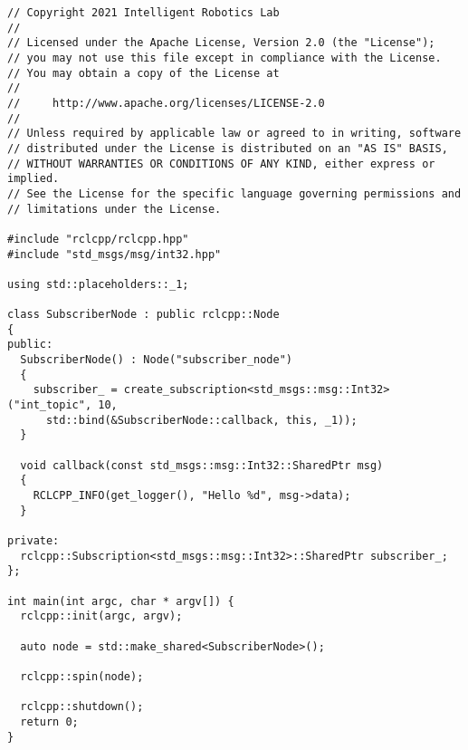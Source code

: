  \footnotesize
\begin{tcolorbox}[sharp corners, colframe=gray!80, colback=LightGray, left=0pt, top=0pt, bottom=0pt, title=\texttt{br2\_basics/src/subscriber\_class.cpp}]
  \begin{verbatim}
// Copyright 2021 Intelligent Robotics Lab
//
// Licensed under the Apache License, Version 2.0 (the "License");
// you may not use this file except in compliance with the License.
// You may obtain a copy of the License at
//
//     http://www.apache.org/licenses/LICENSE-2.0
//
// Unless required by applicable law or agreed to in writing, software
// distributed under the License is distributed on an "AS IS" BASIS,
// WITHOUT WARRANTIES OR CONDITIONS OF ANY KIND, either express or implied.
// See the License for the specific language governing permissions and
// limitations under the License.

#include "rclcpp/rclcpp.hpp"
#include "std_msgs/msg/int32.hpp"

using std::placeholders::_1;

class SubscriberNode : public rclcpp::Node
{
public:
  SubscriberNode() : Node("subscriber_node")
  {
    subscriber_ = create_subscription<std_msgs::msg::Int32>("int_topic", 10,
      std::bind(&SubscriberNode::callback, this, _1));
  }

  void callback(const std_msgs::msg::Int32::SharedPtr msg)
  {
    RCLCPP_INFO(get_logger(), "Hello %d", msg->data);
  }

private:
  rclcpp::Subscription<std_msgs::msg::Int32>::SharedPtr subscriber_;
};

int main(int argc, char * argv[]) {
  rclcpp::init(argc, argv);

  auto node = std::make_shared<SubscriberNode>();

  rclcpp::spin(node);

  rclcpp::shutdown();
  return 0;
}    \end{verbatim}
    \end{tcolorbox}
  \normalsize

